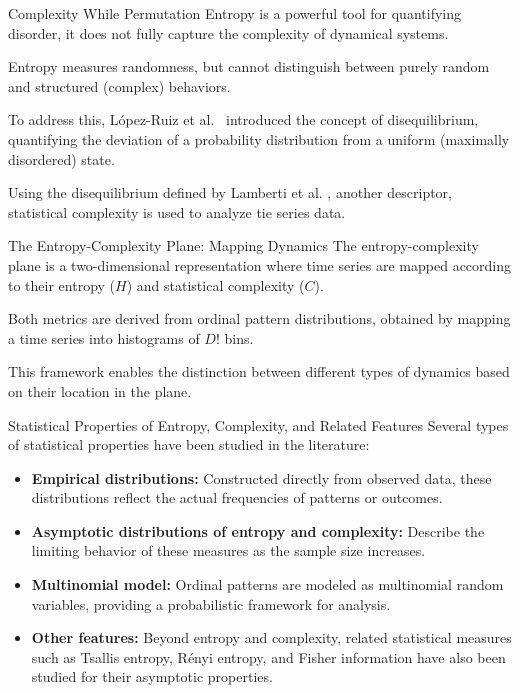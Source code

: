 \documentclass{beamer}
\begin{document}
\begin{frame}{Complexity}
	While Permutation Entropy is a powerful tool for quantifying disorder, it does not fully capture the complexity of dynamical systems.
	
	Entropy measures randomness, but cannot distinguish between purely random and structured (complex) behaviors.
	
	To address this, López-Ruiz et al.~\cite{lopez1995statistical} introduced the concept of \alert{disequilibrium}, quantifying the deviation of a probability distribution from a uniform (maximally disordered) state.
	
	Using the disequilibrium defined by Lamberti et al. \cite{lamberti2004intensive}, another descriptor, statistical complexity is used to analyze tie series data.  
\end{frame}

\begin{frame}{The Entropy-Complexity Plane: Mapping Dynamics}
	The \alert{entropy-complexity plane} is a two-dimensional representation where time series are mapped according to their entropy ($H$) and statistical complexity ($C$).
	
	Both metrics are derived from ordinal pattern distributions, obtained by mapping a time series into histograms of $D!$ bins.
	
	This framework enables the distinction between different types of dynamics based on their location in the plane.
\end{frame}

\begin{frame}{Statistical Properties of Entropy, Complexity, and Related Features}
	Several types of statistical properties have been studied in the literature:
	\begin{itemize}
		\item \textbf{Empirical distributions:} Constructed directly from observed data, these distributions reflect the actual frequencies of patterns or outcomes.
		\item \textbf{Asymptotic distributions of entropy and complexity:} Describe the limiting behavior of these measures as the sample size increases.
		\item \textbf{Multinomial model:} Ordinal patterns are modeled as multinomial random variables, providing a probabilistic framework for analysis.
		\item \textbf{Other features:} Beyond entropy and complexity, related statistical measures such as Tsallis entropy, Rényi entropy, and Fisher information have also been studied for their asymptotic properties.
	\end{itemize}
\end{frame}
\end{document}
